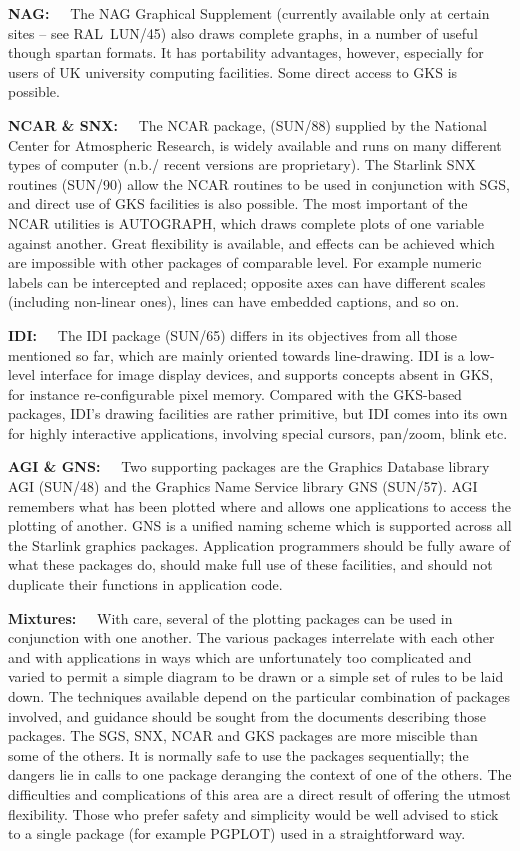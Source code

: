 \documentclass[twoside,11pt]{article}
\renewcommand{\_}{{\tt\char'137}}
\begin{document}
{\bf NAG:~~} The NAG Graphical Supplement (currently available
only at certain sites --  see RAL~LUN/45) also draws complete graphs,
in a number of useful though spartan formats.  It has
portability advantages, however, especially for users of
UK university computing facilities.  Some direct access to GKS is possible.

{\bf NCAR \& SNX:~~} The \mbox{NCAR} package, (SUN/88) supplied by the
National Center for Atmospheric Research, is widely available and runs
on many different types of computer (n.b./ recent versions are proprietary).
The Starlink SNX routines (SUN/90) allow the \mbox{NCAR} routines
to be used in conjunction with SGS, and direct use of GKS
facilities is also possible.  The most important
of the \mbox{NCAR} utilities is \mbox{AUTOGRAPH}, which draws complete
plots of one variable against another.  Great flexibility
is available, and effects can be achieved which are
impossible with other packages of comparable level.  For
example numeric labels can be intercepted and replaced;
opposite axes can have different scales (including
non-linear ones), lines can have embedded captions, and so on.

{\bf IDI:~~} The IDI package (SUN/65) differs in its objectives from all
those mentioned so far, which are mainly oriented towards line-drawing.
IDI is a low-level interface for image display devices, and supports
concepts absent in GKS,
for instance re-configurable pixel memory.
Compared with the GKS-based packages,
IDI's drawing facilities are rather primitive, but IDI comes
into its own for highly interactive applications, involving
special cursors, pan/zoom, blink etc.

{\bf AGI \& GNS:~~} Two supporting packages are the Graphics Database library
AGI (SUN/48) and the Graphics Name Service library GNS (SUN/57).
AGI remembers what has been plotted where and allows one
applications to access the plotting of another.  GNS is a
unified naming scheme which is supported across all the
Starlink graphics packages.
Application programmers should be fully aware of what
these packages do, should make full use of these facilities,
and should not duplicate their functions in application code.

{\bf Mixtures:~~} With care, several of the plotting packages can
be used in conjunction with one another.  The various packages
interrelate with each other and with applications
in ways which are unfortunately too complicated and
varied to permit a simple diagram to be drawn or a simple
set of rules to be laid down.  The techniques available depend on the
particular combination of packages
involved, and guidance should be sought from
the documents describing those packages.   The SGS, SNX,
NCAR and GKS packages are more miscible than some of the
others.  It is normally safe to use the packages
sequentially;  the dangers lie in calls to one package
deranging the context of one of the others.  The difficulties
and complications of this area are a direct result of
offering the utmost flexibility.  Those who prefer
safety and simplicity would be well advised to stick to a single
package (for example \mbox{PGPLOT}) used in a straightforward way.
\end{document}
